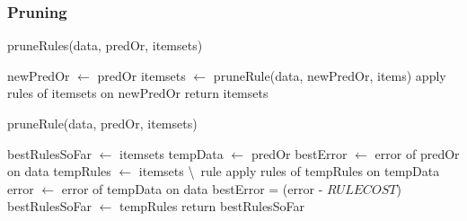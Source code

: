 \documentclass{beamer}
\begin{document}
\begin{frame}
\frametitle{Pruning}
\scriptsize{
\begin{algorithm}[H]
 \caption{pruneRules(data, predOr, itemsets)}

\label{pruneRules}
newPredOr $\leftarrow$ predOr\;
{
itemsets $\leftarrow$ pruneRule(data, newPredOr, items)\;
apply rules of itemsets on newPredOr\;   
}
return itemsets\;
\end{algorithm}


\begin{algorithm}[H]
 \caption{pruneRule(data, predOr, itemsets)}
\label{pruneRule}
\scriptsize
bestRulesSoFar $\leftarrow$ itemsets\;
tempData $\leftarrow$ predOr\;
bestError $\leftarrow$ error of predOr on data\;
{
tempRules $\leftarrow$ itemsets \textbackslash\ rule\;
apply rules of tempRules on tempData\;
error $\leftarrow$ error of tempData on data\;
{
bestError = (error - $RULECOST$)\;
bestRulesSoFar $\leftarrow$ tempRules\;
}
}
return bestRulesSoFar\;
\end{algorithm}
 }
\end{frame}

% 

\end{document}
